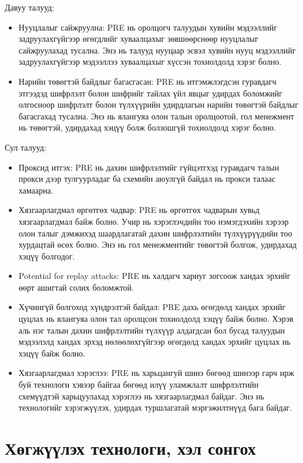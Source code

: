 Давуу талууд:
\begin{itemize}
    \item Нууцлалыг сайжруулна: PRE нь оролцогч талуудын хувийн мэдээллийг задруулахгүйгээр өгөгдлийг хуваалцахыг зөвшөөрснөөр нууцлалыг сайжруулахад тусална. Энэ нь талууд нууцаар эсвэл хувийн нууц мэдээллийг задруулахгүйгээр мэдээллээ хуваалцахыг хүссэн тохиолдолд хэрэг болно.
    \item Нарийн төвөгтэй байдлыг багасгасан: PRE нь итгэмжлэгдсэн гуравдагч этгээдэд шифрлэлт болон шифрийг тайлах үйл явцыг удирдах боломжийг олгосноор шифрлэлт болон түлхүүрийн удирдлагын нарийн төвөгтэй байдлыг багасгахад тусална. Энэ нь ялангуяа олон талын оролцоотой, гол менежмент нь төвөгтэй, удирдахад хэцүү болж болзошгүй тохиолдолд хэрэг болно.
\end{itemize}

Сул талууд:
\begin{itemize}
    \item Проксид итгэх: PRE нь дахин шифрлэлтийг гүйцэтгхэд гуравдагч талын прокси дээр тулгуурладаг ба схемийн аюулгүй байдал нь прокси талаас хамаарна.
    \item Хязгаарлагдмал өргөтгөх чадвар: PRE нь өргөтгөх чадварын хувьд хязгаарлагдмал байж болно. Учир нь хэрэглэчдийн тоо нэмэгдэхийн хэрээр олон талыг дэмжихэд шаардлагатай дахин шифрлэлтийн түлхүүрүүдийн тоо хурдацтай өсөх болно. Энэ нь гол менежментийг төвөгтэй болгож, удирдахад хэцүү болгодог.
    \item Potential for replay attacks: PRE нь халдагч хариуг зогсоож хандах эрхийг өөрт ашигтай солих боломжтой. 
    \item Хүчингүй болгоход хүндрэлтэй байдал: PRE дахь өгөгдөлд хандах эрхийг цуцлах нь ялангуяа олон тал оролцсон тохиолдолд хэцүү байж болно. Хэрэв аль нэг талын дахин шифрлэлтийн түлхүүр алдагдсан бол бусад талуудын мэдээлэлд хандах эрхэд нөлөөлөхгүйгээр өгөгдөлд хандах эрхийг цуцлах нь хэцүү байж болно.
    \item Хязгаарлагдмал хэрэглээ: PRE нь харьцангуй шинэ бөгөөд шинээр гарч ирж буй технологи хэвээр байгаа бөгөөд илүү уламжлалт шифрлэлтийн схемүүдтэй харьцуулахад хэрэглээ нь хязгаарлагдмал байдаг. Энэ нь технологийг хэрэгжүүлэх, удирдах туршлагатай мэргэжилтнүүд бага байдаг.
\end{itemize}

\section{Хөгжүүлэх технологи, хэл сонгох}

